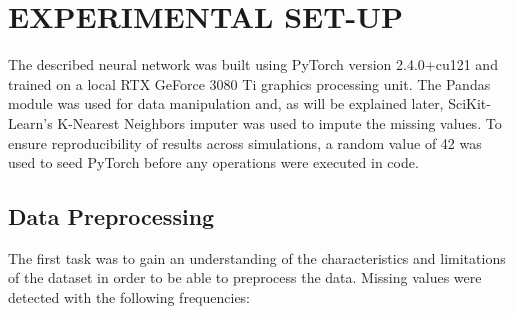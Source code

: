 \section{EXPERIMENTAL SET-UP}


The described neural network was built using PyTorch version 2.4.0+cu121 and trained
on a local RTX GeForce 3080 Ti graphics processing unit. The Pandas module was used
for data manipulation and, as will be explained later, SciKit-Learn's K-Nearest
Neighbors imputer was used to impute the missing values. To ensure reproducibility 
of results across simulations, a random value of 42 was used to seed PyTorch before any operations were 
executed in code.

\subsection{Data Preprocessing}

The first task was to gain an understanding of the characteristics
and limitations of the dataset in order to be able to preprocess the data. 
Missing values were detected with the following frequencies:

